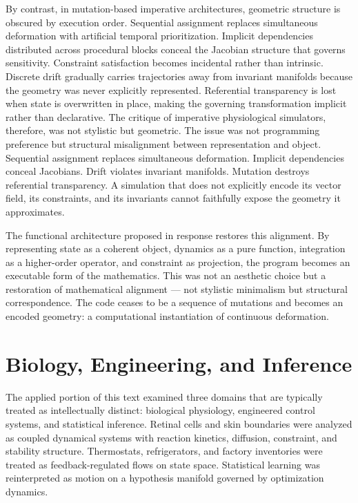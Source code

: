 \documentclass[12pt]{book}
\begin{document}
By contrast, in mutation-based imperative architectures, geometric structure is obscured by execution order. Sequential assignment replaces simultaneous deformation with artificial temporal prioritization. Implicit dependencies distributed across procedural blocks conceal the Jacobian structure that governs sensitivity. Constraint satisfaction becomes incidental rather than intrinsic. Discrete drift gradually carries trajectories away from invariant manifolds because the geometry was never explicitly represented. Referential transparency is lost when state is overwritten in place, making the governing transformation implicit rather than declarative.
The critique of imperative physiological simulators, therefore, was not stylistic but geometric. The issue was not programming preference but structural misalignment between representation and object. Sequential assignment replaces simultaneous deformation. Implicit dependencies conceal Jacobians. Drift violates invariant manifolds. Mutation destroys referential transparency. A simulation that does not explicitly encode its vector field, its constraints, and its invariants cannot faithfully expose the geometry it approximates.

The functional architecture proposed in response restores this alignment. By representing state as a coherent object, dynamics as a pure function, integration as a higher-order operator, and constraint as projection, the program becomes an executable form of the mathematics. This was not an aesthetic choice but a restoration of mathematical alignment — not stylistic minimalism but structural correspondence. The code ceases to be a sequence of mutations and becomes an encoded geometry: a computational instantiation of continuous deformation.

\section{Biology, Engineering, and Inference}

The applied portion of this text examined three domains that are
typically treated as intellectually distinct: biological physiology,
engineered control systems, and statistical inference. Retinal cells
and skin boundaries were analyzed as coupled dynamical systems with
reaction kinetics, diffusion, constraint, and stability structure.
Thermostats, refrigerators, and factory inventories were treated as
feedback-regulated flows on state space. Statistical learning was
reinterpreted as motion on a hypothesis manifold governed by
optimization dynamics.
\end{document}
